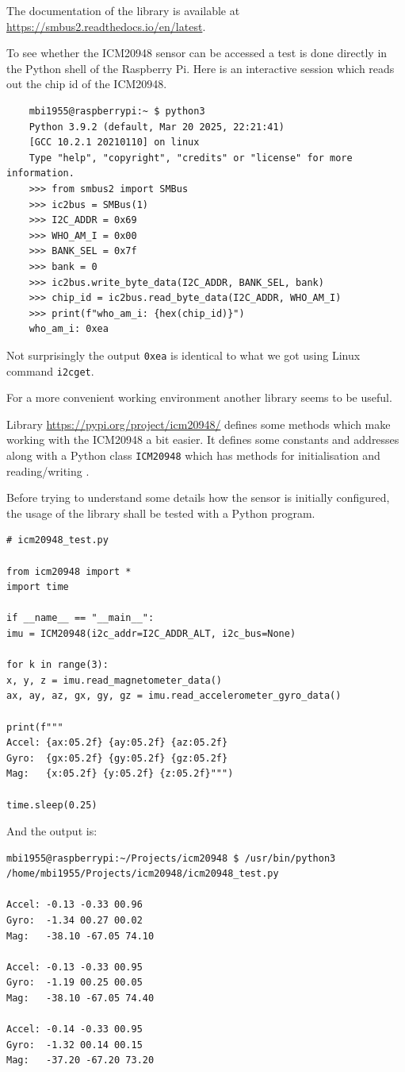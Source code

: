\documentclass[paper=a4, oneside, fontsize=11pt,
parskip=full]{scrartcl}
\begin{document}
The documentation of the library is available at \url{https://smbus2.readthedocs.io/en/latest}.

To see whether the ICM20948 sensor can be accessed a test is done directly in the Python shell of the Raspberry Pi. Here is an interactive session which reads out the chip id of the ICM20948.

\begin{verbatim}
	mbi1955@raspberrypi:~ $ python3
	Python 3.9.2 (default, Mar 20 2025, 22:21:41)
	[GCC 10.2.1 20210110] on linux
	Type "help", "copyright", "credits" or "license" for more information.
	>>> from smbus2 import SMBus
	>>> ic2bus = SMBus(1)
	>>> I2C_ADDR = 0x69
	>>> WHO_AM_I = 0x00
	>>> BANK_SEL = 0x7f
	>>> bank = 0
	>>> ic2bus.write_byte_data(I2C_ADDR, BANK_SEL, bank)
	>>> chip_id = ic2bus.read_byte_data(I2C_ADDR, WHO_AM_I)
	>>> print(f"who_am_i: {hex(chip_id)}")
	who_am_i: 0xea
\end{verbatim}

Not surprisingly the output \verb|0xea| is identical to what we got using Linux command   \verb|i2cget|.

For a more convenient working environment another library seems to be useful. 

Library \url{https://pypi.org/project/icm20948/} defines some methods which make working with the ICM20948 a bit easier. It defines some constants and addresses along with a Python class \verb|ICM20948| which has methods for initialisation and reading/writing .

Before trying to understand some details how the sensor is initially configured, the usage of the library shall be tested with a Python program.

\begin{verbatim}
# icm20948_test.py

from icm20948 import *
import time

if __name__ == "__main__":
imu = ICM20948(i2c_addr=I2C_ADDR_ALT, i2c_bus=None)

for k in range(3):
x, y, z = imu.read_magnetometer_data()
ax, ay, az, gx, gy, gz = imu.read_accelerometer_gyro_data()

print(f"""
Accel: {ax:05.2f} {ay:05.2f} {az:05.2f}
Gyro:  {gx:05.2f} {gy:05.2f} {gz:05.2f}
Mag:   {x:05.2f} {y:05.2f} {z:05.2f}""")

time.sleep(0.25)
\end{verbatim}

And the output is:

\begin{verbatim}
mbi1955@raspberrypi:~/Projects/icm20948 $ /usr/bin/python3 /home/mbi1955/Projects/icm20948/icm20948_test.py

Accel: -0.13 -0.33 00.96
Gyro:  -1.34 00.27 00.02
Mag:   -38.10 -67.05 74.10

Accel: -0.13 -0.33 00.95
Gyro:  -1.19 00.25 00.05
Mag:   -38.10 -67.05 74.40

Accel: -0.14 -0.33 00.95
Gyro:  -1.32 00.14 00.15
Mag:   -37.20 -67.20 73.20
\end{verbatim}
\end{document}
